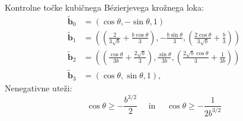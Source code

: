 \documentclass[a4paper, 12pt]{beamer}
\theoremstyle{definition}
\theoremstyle{plain}
\begin{document}
\begin{frame}
Kontrolne točke kubičnega B\'ezierjevega krožnega loka:
\begin{align*}
\boldsymbol{\tilde{b}}_0 &= (\cos{\theta}, -\sin{\theta}, 1)\\
\boldsymbol{\tilde{b}}_1 &= \left ( \left (\frac{2}{3\sqrt{b}}+\frac{b\cos \theta}{3}\right ),-\frac{b \sin \theta}{3},\left (\frac{2\cos \theta}{3\sqrt{b}}+\frac{b}{3}\right )\right )\\
\boldsymbol{\tilde{b}}_2 &= \left ( \left (\frac{\cos \theta}{3b}+\frac{2\sqrt{b}}{3}\right ),\frac{\sin \theta}{3b},\left (\frac{2\sqrt{b}\cos \theta}{3}+\frac{1}{3b}\right )\right )\\
\boldsymbol{\tilde{b}}_3 &= (\cos \theta, \sin\theta, 1),
\end{align*}
Nenegativne uteži:
$$\cos \theta \geq -\frac{b^{3/2}}{2}\quad\text{ in }\quad \cos  \theta \geq -\frac{1}{2b^{3/2}}$$
\end{frame}
\end{document}
